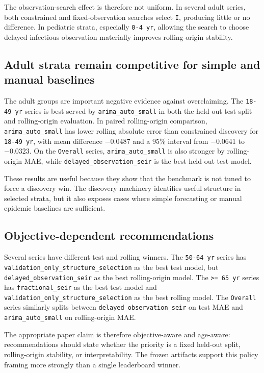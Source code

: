 The observation-search effect is therefore not uniform. In several adult
series, both constrained and fixed-observation searches select \texttt{I},
producing little or no difference. In pediatric strata, especially
\texttt{0-4 yr}, allowing the search to choose delayed infectious observation
materially improves rolling-origin stability.

\subsection{Adult strata remain competitive for simple and manual baselines}

The adult groups are important negative evidence against overclaiming. The
\texttt{18-49 yr} series is best served by \texttt{arima\_auto\_small} in both
the held-out test split and rolling-origin evaluation. In paired rolling-origin
comparison, \texttt{arima\_auto\_small} has lower rolling absolute error than
constrained discovery for \texttt{18-49 yr}, with mean difference
\num{-0.0487} and a 95\% interval from \num{-0.0641} to \num{-0.0323}. On the
\texttt{Overall} series, \texttt{arima\_auto\_small} is also stronger by
rolling-origin MAE, while \texttt{delayed\_observation\_seir} is the best
held-out test model.

These results are useful because they show that the benchmark is not tuned to
force a discovery win. The discovery machinery identifies useful structure in
selected strata, but it also exposes cases where simple forecasting or manual
epidemic baselines are sufficient.

\subsection{Objective-dependent recommendations}

Several series have different test and rolling winners. The \texttt{50-64 yr}
series has \texttt{validation\_only\_structure\_selection} as the best test
model, but \texttt{delayed\_observation\_seir} as the best rolling-origin
model. The \texttt{>= 65 yr} series has \texttt{fractional\_seir} as the best
test model and \texttt{validation\_only\_structure\_selection} as the best
rolling model. The \texttt{Overall} series similarly splits between
\texttt{delayed\_observation\_seir} on test MAE and
\texttt{arima\_auto\_small} on rolling-origin MAE.

The appropriate paper claim is therefore objective-aware and age-aware:
recommendations should state whether the priority is a fixed held-out split,
rolling-origin stability, or interpretability. The frozen artifacts support
this policy framing more strongly than a single leaderboard winner.

